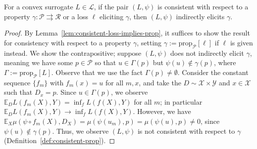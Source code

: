 \documentclass[anon,12pt]{colt2021} %
\newcommand{\Comments}{1}
\newcommand{\mynote}[2]{\ifnum\Comments=1\textcolor{#1}{#2}\fi}
\newcommand{\mytodo}[2]{\ifnum\Comments=1%
	\todo[linecolor=#1!80!black,backgroundcolor=#1,bordercolor=#1!80!black]{#2}\fi}
\newcommand{\raft}[1]{\mytodo{green!20!white}{RF: #1}}
\newcommand{\jessie}[1]{\mynote{purple}{[JF: #1]}}
\newcommand{\jessiet}[1]{\mytodo{purple!20!white}{JF: #1}}
\newcommand{\simplex}{\Delta_\Y}
\newcommand{\prop}[2][\mathcal{P}]{\mathrm{prop}_{#1}[#2]}
\newcommand{\propdis}{\mu}
\newcommand{\D}{\mathcal{D}}
\newcommand{\E}{\mathbb{E}}
\renewcommand{\L}{\mathcal{L}}
\newcommand{\R}{\mathcal{R}}
\renewcommand{\P}{\mathcal{P}}
\newcommand{\X}{\mathcal{X}}
\newcommand{\Y}{\mathcal{Y}}
\newcommand{\toto}{\rightrightarrows}
\begin{document}
\begin{theorem}\label{thm:consistent-implies-indir-elic}
	For a convex surrogate $L \in \L$, if the pair $(L, \psi)$ is consistent with respect to a property $\gamma: \P \toto \R$ or a loss $\ell$ eliciting $\gamma$, then $(L, \psi)$ indirectly elicits $\gamma$.
\end{theorem}
\begin{proof}
	By Lemma~\ref{lem:consistent-loss-implies-prop}, it suffices to show the result for consistency with respect to a property $\gamma$, setting $\gamma := \prop{\ell}$ if $\ell$ is given instead.
	We show the contrapositive; suppose $(L, \psi)$ does not indirectly elicit $\gamma$, meaning we have some $p \in \P$ so that $u \in \Gamma(p)$ but $\psi(u) \not \in \gamma(p)$, where $\Gamma := \prop{L}$.
	Observe that we use the fact $\Gamma(p) \neq \emptyset$.
	Consider the constant sequence $\{f_m\}$ with $f_m(x) = u$ for all $m,x$, and take the $D\sim \X \times\Y$ and $x \in \X$ such that $D_x = p$.
  Since $u \in \Gamma(p)$, we observe $\E_D L(f_m(X), Y) = \inf_f L(f(X),Y)$ for all $m$; in particular $\E_D L(f_m(X), Y) \to \inf_f L(f(X),Y)$.
	However, we have $\E_X \propdis(\psi \circ f_m(X), D_X) = \propdis(\psi(u_m), p) = \propdis(\psi(u), p) \neq 0$, since $\psi(u) \not \in \gamma(p)$.
	Thus, we observe $(L, \psi)$ is not consistent with respect to $\gamma$ (Definition~\ref{def:consistent-prop}).
\end{proof}

\end{document}
